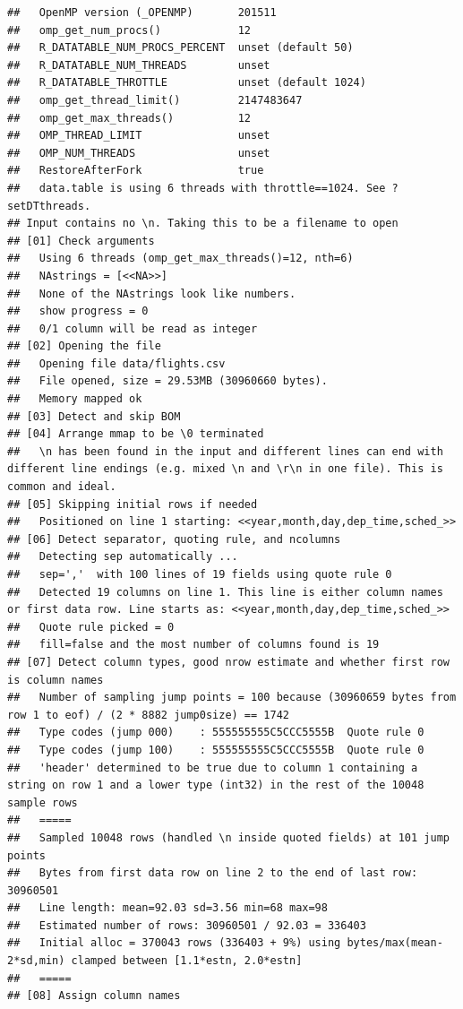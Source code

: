 \documentclass[
  12pt,
]{style/krantz}
\begin{document}
\begin{verbatim}
##   OpenMP version (_OPENMP)       201511
##   omp_get_num_procs()            12
##   R_DATATABLE_NUM_PROCS_PERCENT  unset (default 50)
##   R_DATATABLE_NUM_THREADS        unset
##   R_DATATABLE_THROTTLE           unset (default 1024)
##   omp_get_thread_limit()         2147483647
##   omp_get_max_threads()          12
##   OMP_THREAD_LIMIT               unset
##   OMP_NUM_THREADS                unset
##   RestoreAfterFork               true
##   data.table is using 6 threads with throttle==1024. See ?setDTthreads.
## Input contains no \n. Taking this to be a filename to open
## [01] Check arguments
##   Using 6 threads (omp_get_max_threads()=12, nth=6)
##   NAstrings = [<<NA>>]
##   None of the NAstrings look like numbers.
##   show progress = 0
##   0/1 column will be read as integer
## [02] Opening the file
##   Opening file data/flights.csv
##   File opened, size = 29.53MB (30960660 bytes).
##   Memory mapped ok
## [03] Detect and skip BOM
## [04] Arrange mmap to be \0 terminated
##   \n has been found in the input and different lines can end with different line endings (e.g. mixed \n and \r\n in one file). This is common and ideal.
## [05] Skipping initial rows if needed
##   Positioned on line 1 starting: <<year,month,day,dep_time,sched_>>
## [06] Detect separator, quoting rule, and ncolumns
##   Detecting sep automatically ...
##   sep=','  with 100 lines of 19 fields using quote rule 0
##   Detected 19 columns on line 1. This line is either column names or first data row. Line starts as: <<year,month,day,dep_time,sched_>>
##   Quote rule picked = 0
##   fill=false and the most number of columns found is 19
## [07] Detect column types, good nrow estimate and whether first row is column names
##   Number of sampling jump points = 100 because (30960659 bytes from row 1 to eof) / (2 * 8882 jump0size) == 1742
##   Type codes (jump 000)    : 555555555C5CCC5555B  Quote rule 0
##   Type codes (jump 100)    : 555555555C5CCC5555B  Quote rule 0
##   'header' determined to be true due to column 1 containing a string on row 1 and a lower type (int32) in the rest of the 10048 sample rows
##   =====
##   Sampled 10048 rows (handled \n inside quoted fields) at 101 jump points
##   Bytes from first data row on line 2 to the end of last row: 30960501
##   Line length: mean=92.03 sd=3.56 min=68 max=98
##   Estimated number of rows: 30960501 / 92.03 = 336403
##   Initial alloc = 370043 rows (336403 + 9%) using bytes/max(mean-2*sd,min) clamped between [1.1*estn, 2.0*estn]
##   =====
## [08] Assign column names

\end{verbatim}
\end{document}
